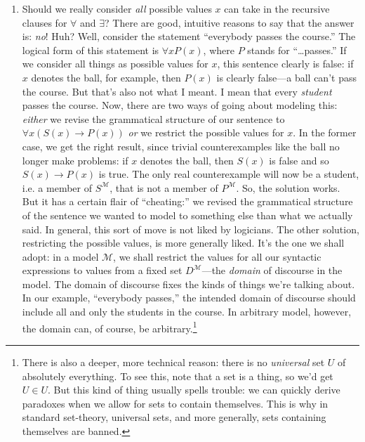 \begin{enumerate}[\thesection.1]
		\item Should we really consider \emph{all} possible values $x$ can take in the recursive clauses for $\forall$ and $\exists$? There are good, intuitive reasons to say that the answer is: \emph{no}! Huh? Well, consider the statement ``everybody passes the course.'' The logical form of this statement is $\forall xP(x)$, where $P$ stands for ``\dots passes.'' If we consider all things as possible values for $x$, this sentence clearly is false: if $x$ denotes the ball, for example, then $P(x)$ is clearly false---a ball can't pass the course. But that's also not what I meant. I mean that every \emph{student} passes the course. Now, there are two ways of going about modeling this: \emph{either} we revise the grammatical structure of our sentence to $\forall x(S(x)\to P(x))$ \emph{or} we restrict the possible values for $x$. In the former case, we get the right result, since trivial counterexamples like the ball no longer make problems: if $x$ denotes the ball, then $S(x)$ is false and so $S(x)\to P(x)$ is true. The only real counterexample will now be a student, i.e. a member of $S^\mathcal{M}$, that is not a member of $P^\mathcal{M}$.	So, the solution works. But it has a certain flair of ``cheating:'' we revised the grammatical structure of the sentence we wanted to model to something else than what we actually said. In general, this sort of move is not liked by logicians. The other solution, restricting the possible values, is more generally liked. It's the one we shall adopt: in a model $\mathcal{M}$, we shall restrict the values for all our syntactic expressions to values from a fixed set $D^\mathcal{M}$---the \emph{domain} of discourse in the model. The domain of discourse fixes the kinds of things we're talking about. In our example, ``everybody passes,'' the intended domain of discourse should include all and only the students in the course. In arbitrary model, however, the domain can, of course, be arbitrary.\footnote{There is also a deeper, more technical reason: there is no \emph{universal} set $U$ of absolutely everything. To see this, note that a set is a thing, so we'd get $U\in U$. But this kind of thing usually spells trouble: we can quickly derive paradoxes when we allow for sets to contain themselves. This is why in standard set-theory, universal sets, and more generally, sets containing themselves are banned.}
		

\end{enumerate}
